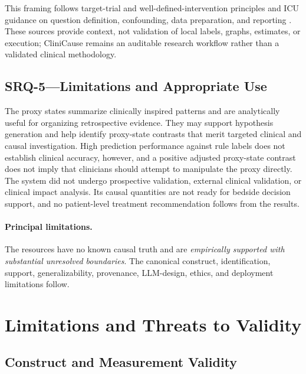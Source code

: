 This framing follows target-trial and well-defined-intervention principles \cite{hernan_robins_2016_target_trial,hernan_taubman_2008_well_defined_interventions} and ICU guidance on question definition, confounding, data preparation, and reporting \cite{smit_2023_causal_inference_icu_scoping_review}.  These sources provide context, not validation of local labels, graphs, estimates, or execution; CliniCause remains an auditable research workflow rather than a validated clinical methodology.

\subsection{SRQ-5---Limitations and Appropriate Use}
\label{subsec:discussion:clinical-meaning}

The proxy states summarize clinically inspired patterns and are analytically useful for organizing retrospective evidence.  They may support hypothesis generation and help identify proxy-state contrasts that merit targeted clinical and causal investigation.  High prediction performance against rule labels does not establish clinical accuracy, however, and a positive adjusted proxy-state contrast does not imply that clinicians should attempt to manipulate the proxy directly.  The system did not undergo prospective validation, external clinical validation, or clinical impact analysis.  Its causal quantities are not ready for bedside decision support, and no patient-level treatment recommendation follows from the results.

\paragraph{Principal limitations.}
The resources have no known causal truth and are \emph{empirically supported with substantial unresolved boundaries}.  The canonical construct, identification, support, generalizability, provenance, LLM-design, ethics, and deployment limitations follow.

\section{Limitations and Threats to Validity}
\label{sec:discussion:limitations-threats-validity}

\subsection{Construct and Measurement Validity}
\label{subsec:discussion:construct-measurement-validity}


